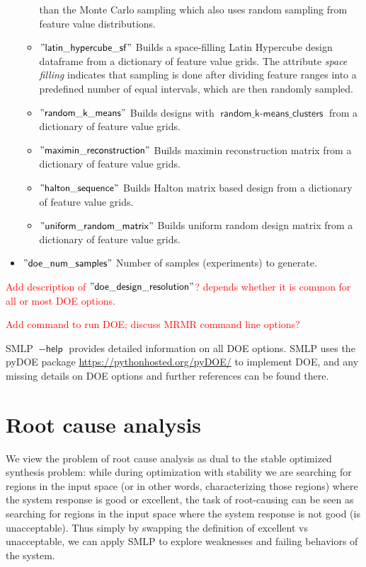 \documentclass[a4paper,parskip=half]{article} %
\newcommand*\option[1]{\operatorname{\mathsf{#1}}} %
\newcommand*\speckey[1]{\operatorname{\mathsf{"{#1}"}}} %
\newcommand*\specval[1]{\operatorname{\mathsf{{#1}}}} %
\newcommand\todozk[1]{\textcolor{red}{#1}}
\newcommand*\ZK{\todozk}
\begin{document}
\begin{itemize}
\begin{itemize}
than the Monte Carlo sampling which also uses random sampling from feature value distributions.
\item $\speckey{latin\_hypercube\_sf}$ Builds a space-filling Latin Hypercube design dataframe from a dictionary of feature value grids.
The attribute \emph{space filling} indicates that sampling is done after dividing feature ranges into a predefined number of
equal intervals,  which are then randomly sampled. 
\item $\speckey{random\_k\_means}$ Builds designs with $\specval{random\_k-means\_ clusters}$ from a dictionary of feature value grids.
\item $\speckey{maximin\_reconstruction}$ Builds maximin reconstruction matrix from a dictionary of feature value grids. 
\item $\speckey{halton\_sequence}$ Builds Halton matrix based design from a dictionary of  feature value grids.
\item $\speckey{uniform\_random\_matrix}$ Builds uniform random design matrix from a dictionary of feature value grids.
\end{itemize}
\item $\speckey{doe\_num\_samples}$ Number of samples (experiments) to generate.
\end{itemize}
\ZK{Add description of  $\speckey{doe\_design\_resolution}$? depends whether it is common for all or most DOE options.}

\ZK{Add command to run DOE; discuss MRMR command line options? }

SMLP $\option{--help}$ provides detailed information on all DOE options. 
SMLP uses the pyDOE package \url{https://pythonhosted.org/pyDOE/} to implement DOE, and any missing details 
on DOE options and further references can be found there.
\section{Root cause analysis}\label{sec:rca}

We view the problem of root cause analysis as dual to the stable optimized synthesis problem: while during optimization with 
stability we are searching for regions in the input space (or in other words, characterizing those regions) where the system response 
is good or excellent, the task of root-causing can be seen as searching for regions in the input space where the system response is 
not good (is unacceptable). Thus simply by swapping the definition of excellent vs unacceptable, we can apply SMLP to explore 
weaknesses and failing behaviors of the system.
\end{document}
